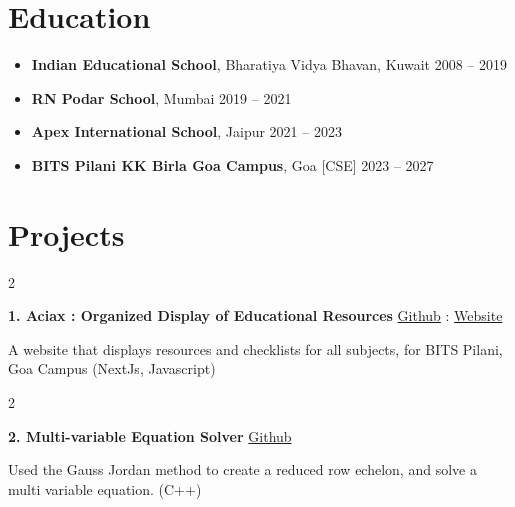 \documentclass[10pt, letterpaper]{article}
\newenvironment{twocolentry}[2][]{
    \onecolentry
    \def\secondColumn{#2}
    \setcolumnwidth{\fill, 4.5 cm}
    \begin{paracol}{2}
}{
    \switchcolumn \raggedleft \secondColumn
    \end{paracol}
    \endonecolentry
} %
\begin{document}
    \section{Education}
        
        \begin{itemize}
            \item \textbf{Indian Educational School}, Bharatiya Vidya Bhavan, Kuwait \hfill 2008 -- 2019
            \item \textbf{RN Podar School}, Mumbai \hfill 2019 -- 2021
            \item \textbf{Apex International School}, Jaipur \hfill 2021 -- 2023
            \item \textbf{BITS Pilani KK Birla Goa Campus}, Goa [CSE] \hfill 2023 -- 2027
        \end{itemize}




    
    \section{Projects}



        
        \begin{twocolentry}{
            \href{https://github.com/Darelife/aciax}{Github} : \href{https://aciax.vercel.app/}{Website}
        }
            \textbf{1. Aciax : Organized Display of Educational Resources}\end{twocolentry}

        \vspace{0.10 cm}            
                A website that displays resources and checklists for all subjects, for BITS Pilani, Goa Campus (NextJs, Javascript)
            
        


        \vspace{0.3 cm}

        \begin{twocolentry}{
            \href{https://github.com/Darelife/MultiEquationSolver}{Github}
        }
            \textbf{2. Multi-variable Equation Solver}\end{twocolentry}

        \vspace{0.10 cm}
                Used the Gauss Jordan method to create a reduced row echelon, and solve a multi variable equation. (C++)


        \vspace{0.3 cm}
\end{document}
